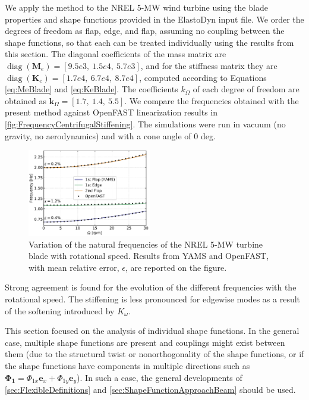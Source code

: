 \documentclass[wes, manuscript]{copernicus}
\renewcommand{\v}[1]{\boldsymbol{#1}}
\newcommand{\m}[1]{\boldsymbol{#1}}
\begin{document}
We apply the method to the NREL 5-MW wind turbine using the blade properties and shape functions provided in the ElastoDyn input file. 
We order the degrees of freedom as  flap,  edge, and  flap, assuming no coupling between the shape functions, so that each can be treated individually using the results from this section.
The diagonal coefficients of the mass matrix are $\operatorname{diag}(\m{M}_e) = [9.5e3,\ 1.5e4,\ 5.7e3]$, and for the stiffness matrix they are 
$\operatorname{diag}(\m{K}_e)=[1.7e4,\ 6.7e4,\ 8.7e4]$, computed according to Equations \ref{eq:MeBlade} and \ref{eq:KeBlade}.
The coefficients $k_\Omega$ of each degree of freedom are obtained as $\v{k}_\Omega =[1.7,\ 1.4,\ 5.5]$. We compare the frequencies obtained with the present method against OpenFAST linearization results in \autoref{fig:FrequencyCentrifugalStiffening}.
The simulations were run in vacuum (no gravity, no aerodynamics) and with a cone angle of 0 deg.
\noindent\begin{figure}[!htb]\centering%
  \includegraphics[width=0.48\textwidth]{figs/FrequencyCentrifugalStiffening.pdf}
  \caption{Variation of the natural frequencies of the NREL 5-MW turbine blade with rotational speed. Results from YAMS and OpenFAST, with mean relative error, $\epsilon$, are reported on the figure.}\label{fig:FrequencyCentrifugalStiffening}%
\end{figure}
Strong agreement is found for the evolution of the different frequencies with the rotational speed.
The stiffening is less pronounced for edgewise modes as a result of the softening introduced by $K_\omega$.

This section focused on the analysis of individual shape functions.
In the general case, multiple shape functions are present and couplings might exist between them (due to the structural twist or nonorthogonality of the shape functions, or if the shape functions have components in multiple directions such as $\v{\Phi_1}=\Phi_{1x}\v{e}_x+\Phi_{1y}\v{e}_y$).
In such a case, the general developments of 
\autoref{sec:FlexibleDefinitions} and 
\autoref{sec:ShapeFunctionApproachBeam} should be used.
\end{document}
